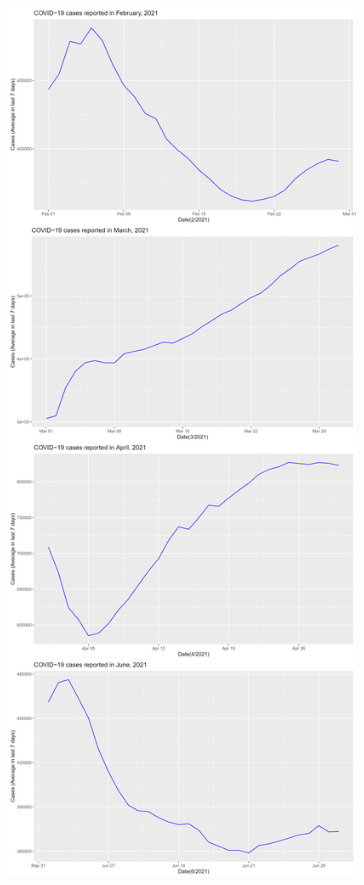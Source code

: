 \documentclass[a4paper]{article}
\theoremstyle{definition}
\begin{document}
\begin{enumerate}[i)]
\begin{enumerate}[1)]
\begin{figure}[H]
				\centering
				\includegraphics[height=23cm,width=13cm]{images/8.1.2.png}
			\end{figure}
			\begin{figure}[H]
				\centering

\end{figure}
\end{enumerate}
\end{enumerate}
\end{document}
